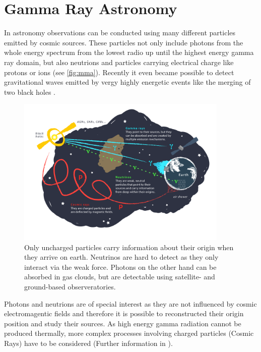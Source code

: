 \chapter{Gamma Ray Astronomy}
In astronomy observations can be conducted using many different particles emitted by cosmic sources. 
These particles not only include photons from the whole energy spectrum from the lowest radio up until the highest energy gamma ray domain,
but also neutrions and particles carrying electrical charge like protons or ions (see \autoref{fig:mma}). 
Recently it even became possible to detect gravitational waves emitted by vergy highly energetic events like the merging of two black holes \cite{PhysRevLett.116.061102}.
\begin{figure}
    \centering
    \includegraphics[width=0.9\textwidth]{images/cosmic_messengers.png}
    \caption{Only uncharged particles carry information about their origin when they arrive on earth.
        Neutrinos are hard to detect as they only interact via the weak force.
        Photons on the other hand can be absorbed in gas clouds, but are detectable using satellite- and ground-based observeratories.
    }
    \label{fig:mma}
\end{figure}

Photons and neutrions are of special interest as they are not influenced by cosmic electromagentic fields and therefore it is possible to reconstructed their origin 
position and study their sources.
As high energy gamma radiation cannot be produced thermally, more complex processes involving charged particles (Cosmic Rays) have to be considered 
(Further information in \cite{s_funk}).

